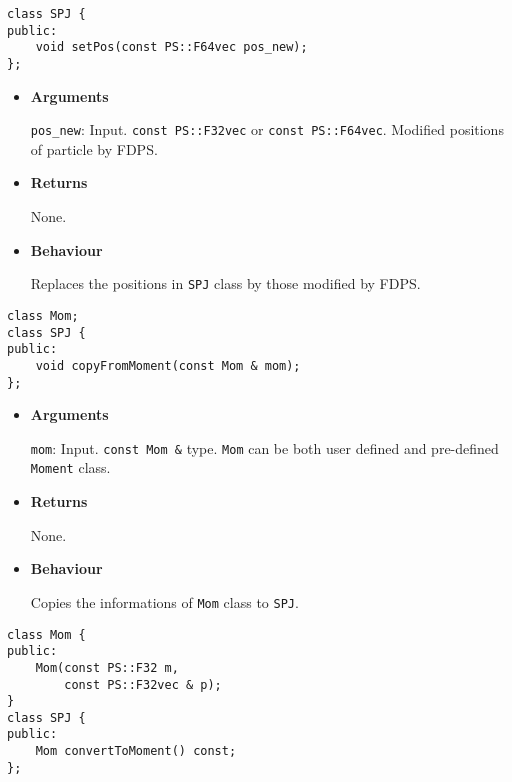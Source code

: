 
\begin{screen}
\begin{verbatim}
class SPJ {
public:
    void setPos(const PS::F64vec pos_new);
};
\end{verbatim}
\end{screen}

\begin{itemize}

\item {\bf Arguments}

  \texttt{pos\_new}: Input. \texttt{const PS::F32vec} or \texttt{const PS::F64vec}.
  Modified positions of particle by FDPS.

\item {\bf Returns}

  None.
  
\item {\bf Behaviour}

  Replaces the positions in \texttt{SPJ} class by those modified by FDPS.

\end{itemize}


\begin{screen}
\begin{verbatim}
class Mom;
class SPJ {
public:
    void copyFromMoment(const Mom & mom);
};
\end{verbatim}
\end{screen}

\begin{itemize}
  
\item {\bf Arguments}

  \texttt{mom}: Input. \texttt{const Mom \&} type.
  \texttt{Mom} can be both user defined and pre-defined \texttt{Moment} class.

\item {\bf Returns}

  None.
  
\item {\bf Behaviour}

  Copies the informations of \texttt{Mom} class to \texttt{SPJ}.

\end{itemize}


\begin{screen}
\begin{verbatim}
class Mom {
public:
    Mom(const PS::F32 m,
        const PS::F32vec & p);
}
class SPJ {
public:
    Mom convertToMoment() const;
};
\end{verbatim}
\end{screen}

